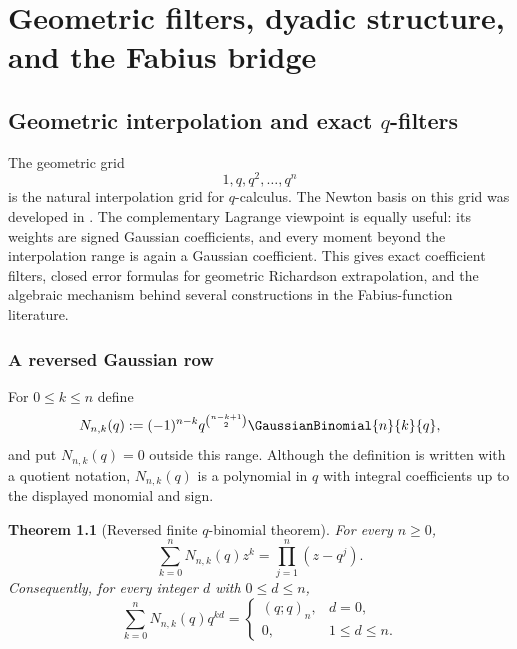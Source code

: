 \documentclass[11pt,a4paper,oneside,openany]{book}
\newtheorem{theorem}{Theorem}[chapter]
\theoremstyle{definition}
\theoremstyle{remark}
\begin{document}
\part{Geometric filters, dyadic structure, and the Fabius bridge}

\chapter{Geometric interpolation and exact \texorpdfstring{$q$}{q}-filters}\label{chap:geometric-filters}

The geometric grid
\[
  1,q,q^2,\ldots,q^n
\]
is the natural interpolation grid for $q$-calculus.  The Newton basis on this grid was developed in .  The complementary Lagrange viewpoint is equally useful: its weights are signed Gaussian coefficients, and every moment beyond the interpolation range is again a Gaussian coefficient.  This gives exact coefficient filters, closed error formulas for geometric Richardson extrapolation, and the algebraic mechanism behind several constructions in the Fabius-function literature.

\section{A reversed Gaussian row}

For $0\le k\le n$ define
\begin{equation}\label{eq:reversed-gaussian-row}
 N_{n,k}(q)
 :=(-1)^{n-k}q^{\binom{n-k+1}{2}}\GaussianBinomial{n}{k}{q},
\end{equation}
and put $N_{n,k}(q)=0$ outside this range.  Although the definition is written with a quotient notation, $N_{n,k}(q)$ is a polynomial in $q$ with integral coefficients up to the displayed monomial and sign.

\begin{theorem}[Reversed finite $q$-binomial theorem]\label{thm:reversed-qbinomial}
For every $n\ge0$,
\begin{equation}\label{eq:reversed-product}
 \sum_{k=0}^{n}N_{n,k}(q)z^k
 =\prod_{j=1}^{n}(z-q^j).
\end{equation}
Consequently, for every integer $d$ with $0\le d\le n$,
\begin{equation}\label{eq:reversed-moments}
 \sum_{k=0}^{n}N_{n,k}(q)q^{kd}
 =
 \begin{cases}
   (q;q)_n,&d=0,\\
   0,&1\le d\le n.
 \end{cases}
\end{equation}
\end{theorem}
\end{document}
